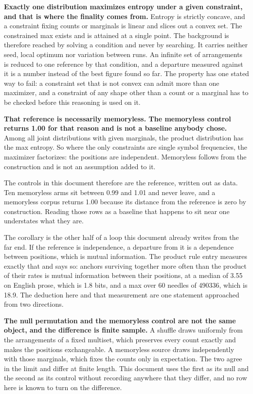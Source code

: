 \textbf{Exactly one distribution maximizes entropy under a given constraint, and that is where the finality comes from.} Entropy is strictly concave, and a constraint fixing counts or marginals is linear and slices out a convex set. The constrained max exists and is attained at a single point. The background is therefore reached by solving a condition and never by searching. It carries neither seed, local optimum nor variation between runs. An infinite set of arrangements is reduced to one reference by that condition, and a departure measured against it is a number instead of the best figure found so far. The property has one stated way to fail: a constraint set that is not convex can admit more than one maximizer, and a constraint of any shape other than a count or a marginal has to be checked before this reasoning is used on it.

\textbf{That reference is necessarily memoryless. The memoryless control returns 1.00 for that reason and is not a baseline anybody chose.} Among all joint distributions with given marginals, the product distribution has the max entropy. So where the only constraints are single symbol frequencies, the maximizer factorizes: the positions are independent. Memoryless follows from the construction and is not an assumption added to it.

The controls in this document therefore are the reference, written out as data. Ten memoryless arms sit between 0.99 and 1.01 and never leave, and a memoryless corpus returns 1.00 because its distance from the reference is zero by construction. Reading those rows as a baseline that happens to sit near one understates what they are.

The corollary is the other half of a loop this document already writes from the far end. If the reference is independence, a departure from it is a dependence between positions, which is mutual information. The product rule entry measures exactly that and says so: anchors surviving together more often than the product of their rates is mutual information between their positions, at a median of 3.55 on English prose, which is 1.8 bits, and a max over 60 needles of 490336, which is 18.9. The deduction here and that measurement are one statement approached from two directions.

\textbf{The null permutation and the memoryless control are not the same object, and the difference is finite sample.} A shuffle draws uniformly from the arrangements of a fixed multiset, which preserves every count exactly and makes the positions exchangeable. A memoryless source draws independently with those marginals, which fixes the counts only in expectation. The two agree in the limit and differ at finite length. This document uses the first as its null and the second as its control without recording anywhere that they differ, and no row here is known to turn on the difference.

